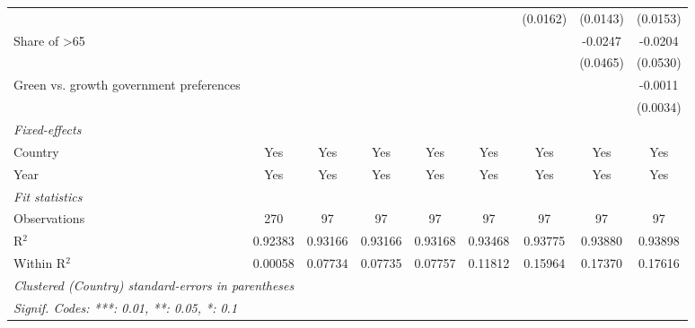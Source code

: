 \begin{table}[htbp]
\begin{tabular}{lcccccccc}
                                              &          &               &          &          &          & (0.0162) & (0.0143)       & (0.0153)\\   
      Share of >65                            &          &               &          &          &          &          & -0.0247        & -0.0204\\   
                                              &          &               &          &          &          &          & (0.0465)       & (0.0530)\\   
      Green vs. growth government preferences &          &               &          &          &          &          &                & -0.0011\\   
                                              &          &               &          &          &          &          &                & (0.0034)\\   
      \midrule
      \emph{Fixed-effects}\\
      Country                                 & Yes      & Yes           & Yes      & Yes      & Yes      & Yes      & Yes            & Yes\\  
      Year                                    & Yes      & Yes           & Yes      & Yes      & Yes      & Yes      & Yes            & Yes\\  
      \midrule
      \emph{Fit statistics}\\
      Observations                            & 270      & 97            & 97       & 97       & 97       & 97       & 97             & 97\\  
      R$^2$                                   & 0.92383  & 0.93166       & 0.93166  & 0.93168  & 0.93468  & 0.93775  & 0.93880        & 0.93898\\  
      Within R$^2$                            & 0.00058  & 0.07734       & 0.07735  & 0.07757  & 0.11812  & 0.15964  & 0.17370        & 0.17616\\  
      \midrule \midrule
      \multicolumn{9}{l}{\emph{Clustered (Country) standard-errors in parentheses}}\\
      \multicolumn{9}{l}{\emph{Signif. Codes: ***: 0.01, **: 0.05, *: 0.1}}\\
   \end{tabular}
\end{table}


